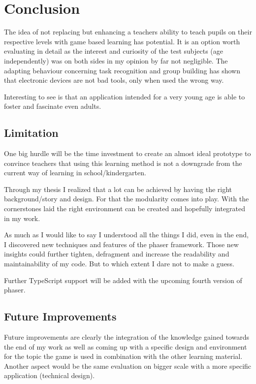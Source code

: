 
\chapter{Conclusion}\label{ch:conclusion}
The idea of not replacing but enhancing a teachers ability to teach pupils on their respective levels with
game based learning has potential. It is an option worth evaluating in detail as the interest and curiosity of
the test subjects (age independently) was on both sides in my opinion by far not negligible.
The adapting behaviour concerning task recognition and group building has shown that electronic
devices are not bad tools, only when used the wrong way.

Interesting to see is that an application intended for a very young age is able to foster and fascinate even adults.

\section{Limitation}\label{sec:limitation}
One big hurdle will be the time investment to create an almost ideal prototype to convince teachers that using this learning
method is not a downgrade from the current way of learning in school/kindergarten.

Through my thesis I realized that a lot can be achieved by having the right background/story and design.
For that the modularity comes into play.
With the cornerstones laid the right environment can be created and hopefully integrated in my work.

As much as I would like to say I understood all the things I did, even in the end, I discovered new techniques and features of
the phaser framework. Those new insights could further tighten, defragment and increase the readability and maintainability of my code.
But to which extent I dare not to make a guess.

Further TypeScript support will be added with the upcoming fourth version of phaser.

\section{Future Improvements}\label{sec:future-improvements}
Future improvements are clearly the integration of the knowledge gained towards the end of my work as well as coming up
with a specific design and environment for the topic the game is used in combination with the other learning material.
Another aspect would be the same evaluation on bigger scale with a more specific application (technical design).

